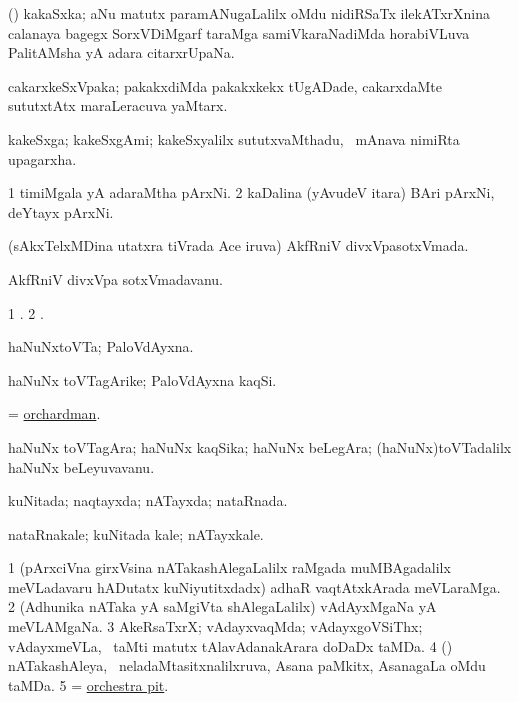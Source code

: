 \bentry
{}
\gl{\nA}
\bmng
(\Bwvi) kakaSxka; aNu matutx paramANugaLalilx oMdu nidiRSaTx ilekATxrXnina calanaya bagegx SorxVDiMgarf taraMga samiVkaraNadiMda horabiVLuva PalitAMsha yA adara citarxrUpaNa. 
\emng
\eentry

\bentry
{}
\gl{\nA}
\bmng
cakarxkeSxVpaka; pakakxdiMda pakakxkekx tUgADade, cakarxdaMte sututxtAtx maraLeracuva yaMtarx. 
\emng
\eentry

\bentry
{}
\gl{\nA}
\bmng
kakeSxga; kakeSxgAmi; kakeSxyalilx sututxvaMthadu, \kanmu\ mAnava nimiRta upagarxha. 
\emng
\eentry

\bentry
{}
\gl{\nA}
\bmng
\bnum
\num{1} timiMgala yA adaraMtha pArxNi. 
\num{2} kaDalina (yAvudeV itara) BAri pArxNi, deYtayx pArxNi. 
\enum
\emng
\eentry

\bentry
{}
\gl{\gu}
\bmng
(sAkxTelxMDina utatxra tiVrada Ace iruva) AkfRniV divxVpasotxVmada. 
\emng
\eentry

\bentry
{}
\gl{\nA}
\bmng
AkfRniV divxVpa sotxVmadavanu. 
\emng
\eentry

\bentry
{}
\gl{\saMkiSx}
\bmng
% 
\bnum
\num{1} . 
\num{2} . 
\enum
\emng
\eentry

\bentry
{}
\gl{\nA}
\bmng
haNuNxtoVTa; PaloVdAyxna. 
\emng
\eentry

\bentry
{}
\gl{\nA}
\bmng
haNuNx toVTagArike; PaloVdAyxna kaqSi. 
\emng
\eentry

\bentry
{}
\gl{\nA}
\bmng
= \hyperlink{orchardman}{orchardman}. 
\emng
\eentry

\bentry
{}
\gl{\nA}
\bmng
haNuNx toVTagAra; haNuNx kaqSika; haNuNx beLegAra; (haNuNx)toVTadalilx haNuNx beLeyuvavanu. 
\emng
\eentry

\bentry
{}
\gl{\gu}
\bmng
kuNitada; naqtayxda; nATayxda; nataRnada. 
\emng
\eentry

\bentry
{}
\gl{\nA}
\bmng
nataRnakale; kuNitada kale; nATayxkale. 
\emng
\eentry

\bentry
{}
\gl{\nA}
\bmng
\bnum
\num{1} (pArxciVna girxVsina nATakashAlegaLalilx raMgada muMBAgadalilx meVLadavaru hADutatx kuNiyutitxdadx) adhaR vaqtAtxkArada meVLaraMga. 
\num{2} (Adhunika nATaka yA saMgiVta shAlegaLalilx) vAdAyxMgaNa yA meVLAMgaNa. 
\num{3} AkeRsaTxrX; vAdayxvaqMda; vAdayxgoVSiThx; vAdayxmeVLa, \sA\ taMti matutx tAlavAdanakArara doDaDx taMDa. 
\num{4} (\ame) nATakashAleya, \kanmu\ neladaMtasitxnalilxruva, Asana paMkitx, AsanagaLa oMdu taMDa. 
\num{5} = \hyperlink{orchestra pit}{orchestra pit}. 
\enum
\emng
\eentry

